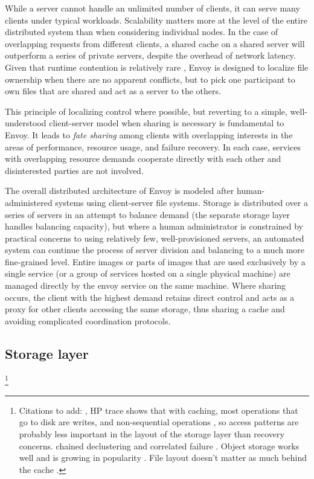 While a server cannot handle an unlimited number of clients, it can serve many clients under typical workloads. Scalability matters more at the level of the entire distributed system than when considering individual nodes. In the case of overlapping requests from different clients, a shared cache on a shared server will outperform a series of private servers, despite the overhead of network latency. Given that runtime contention is relatively rare \cite{kistler}, Envoy is designed to localize file ownership when there are no apparent conflicts, but to pick one participant to own files that are shared and act as a server to the others.

This principle of localizing control where possible, but reverting to a simple, well-understood client-server model when sharing is necessary is fundamental to Envoy. It leads to \emph{fate sharing} among clients with overlapping interests in the areas of performance, resource usage, and failure recovery. In each case, services with overlapping resource demands cooperate directly with each other and disinterested parties are not involved.

The overall distributed architecture of Envoy is modeled after human-administered systems using client-server file systems. Storage is distributed over a series of servers in an attempt to balance demand (the separate storage layer handles balancing capacity), but where a human administrator is constrained by practical concerns to using relatively few, well-provisioned servers, an automated system can continue the process of server division and balancing to a much more fine-grained level. Entire images or parts of images that are used exclusively by a single service (or a group of services hosted on a single physical machine) are managed directly by the envoy service on the same machine. Where sharing occurs, the client with the highest demand retains direct control and acts as a proxy for other clients accessing the same storage, thus sharing a cache and avoiding complicated coordination protocols.

\subsection{Storage layer}

\footnote{Citations to add: \cite{stein05}, HP trace shows that with caching, most operations that go to disk are writes, and non-sequential operations \cite{ruemmler}, so access patterns are probably less important in the layout of the storage layer than recovery concerns. chained declustering and correlated failure \cite{hsiao,lee96}. Object storage works well and is growing in popularity \cite{factor}. File layout doesn't matter as much behind the cache \cite{stein05}.}

